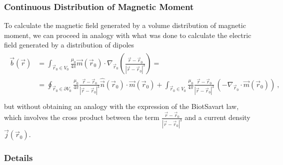 \documentclass[letterpaper,10pt,english]{jupyterBook}
\begin{document}
\subsubsection{Continuous Distribution of Magnetic Moment}
\label{\detokenize{ch/principles-matter-magnetization:continuous-distribution-of-magnetic-moment}}
\sphinxAtStartPar
To calculate the magnetic field generated by a volume distribution of magnetic moment, we can proceed in analogy with what was done to calculate the electric field generated by a distribution of dipoles
\begin{equation*}
\begin{split}\begin{aligned}
\vec{b}(\vec{r})
  & = \int_{\vec{r}_0 \in V_0} \frac{\mu_0}{4 \pi } \vec{m}(\vec{r}_0) \cdot \nabla_{\vec{r}_0}  \left( \frac{\vec{r} - \vec{r}_0}{|\vec{r} - \vec{r}_0|^3} \right) = \\
  & = \oint_{\vec{r}_0 \in \partial V_0} \frac{\mu_0}{4 \pi}  \frac{\vec{r} - \vec{r}_0}{|\vec{r} - \vec{r}_0|^3} \hat{\vec{n}}(\vec{r}_0) \cdot \vec{m}(\vec{r}_0) + \int_{\vec{r}_0 \in V_0} \frac{\mu_0}{4 \pi} \frac{\vec{r} - \vec{r}_0}{|\vec{r} - \vec{r}_0|^3} \,\left( - \nabla_{\vec{r}_0} \cdot \vec{m}(\vec{r}_0) \right) \ , \\
\end{aligned}\end{split}
\end{equation*}
\sphinxAtStartPar
but without obtaining an analogy with the expression of the Biot\sphinxhyphen{}Savart law, which involves the cross product between the term \(\frac{\vec{r}- \vec{r}_0}{|\vec{r} - \vec{r}_0|^3}\) and a current density \(\vec{j}(\vec{r}_0)\).
\subsubsection*{Details}
\end{document}
